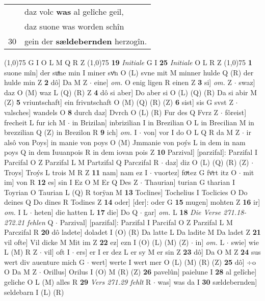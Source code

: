 \documentclass[8pt,a4paper,notitlepage]{article}
\begin{document}
\begin{table}[ht]
\begin{minipage}[t]{0.5\linewidth}
\begin{tabular}{rl}
 & daz volc \textbf{was} al gelîche geil,\\ 
 & daz suone was worden schîn\\ 
30 & gein der \textbf{sældebernden} herzogîn.\\ 
\end{tabular}
\scriptsize
\line(1,0){75} \newline
G I O L M Q R Z \newline
\line(1,0){75} \newline
\textbf{19} \textit{Initiale} G I  \textbf{25} \textit{Initiale} O L R Z  \newline
\line(1,0){75} \newline
\textbf{1} suone mîn] der suͤne min I miner svͦn O (L) svne mit M minner hulde Q (R) der hulde min Z \textbf{2} dô] Da M Z  $\cdot$ eine] \textit{om.} O enig ligen R einen Z \textbf{3} si] \textit{om.} Z  $\cdot$ swaz] daz O (M) waz L (Q) (R) Z \textbf{4} dô si aber] Do aber si O (L) (Q) (R) Da si abir M (Z) \textbf{5} vriuntschaft] ein frivntschaft O (M) (Q) (R) (Z) \textbf{6} sist] sis G svst Z  $\cdot$ valsches] wandels O \textbf{8} durch daz] Dvrch O (L) (R) Fur des Q Fvrz Z  $\cdot$ fôreist] frecheit L fur ich M  $\cdot$ in Brizilan] inbrizilian I in Brezilian O L in Brecilian M in brezzilian Q (Z) in Brezilon R \textbf{9} ich] \textit{om.} I  $\cdot$ von] vor I do O L Q R da M Z  $\cdot$ ir alsô von Poys] in manie von poys O (M) Jmmanie von poýs L in dem in nam poys Q in dem Iuuanpois R in dem iovan pois Z \textbf{10} Parzival] [parzifal]: Parzifal I Parcifal O Z Parzifal L M Partzifal Q Parczifal R  $\cdot$ daz] diz O (L) (Q) (R) (Z)  $\cdot$ Troys] Troýs L trois M R Z \textbf{11} nam] nam ez I  $\cdot$ vuortez] foͮtez G fvͦrt itz O  $\cdot$ mit im] von R \textbf{12} es] sin I Ez O M Er Q Des Z  $\cdot$ Thaurian] turian G tharian I Toyrian O Taurian L (Q) R torÿan M \textbf{13} Toclines] Tochelius I Toclicies O Do deines Q Do dines R Todines Z \textbf{14} oder] [der]: oder G \textbf{15} mugen] mohten Z \textbf{16} ir] \textit{om.} I L  $\cdot$ heten] die hatten L \textbf{17} die] Do Q  $\cdot$ gar] \textit{om.} L \textbf{18} \textit{Die Verse 271.18-272.21 fehlen} Q   $\cdot$ Parzival] [parzifal]: Parzifal I Parcifal O Z Parzifal L M Parczifal R \textbf{20} dô ladete] doladet I (O) (R) Da latte L Da ladite M Da ladet Z \textbf{21} vil ofte] Vil dicke M Mit im Z \textbf{22} ez] ezn I (O) (L) (M) (Z)  $\cdot$ in] \textit{om.} L  $\cdot$ swie] wie L (M) R Z  $\cdot$ vil] oft I  $\cdot$ ers] er I er dez L er sy M er sin Z \textbf{23} dô] Da O M Z \textbf{24} sus wert div auenture mich G  $\cdot$ wert] werte I wert mer O (L) (M) (R) (Z) \textbf{25} dô] ÷o O Da M Z  $\cdot$ Orillus] Orilus I (O) M (R) (Z) \textbf{26} pavelûn] paielune I \textbf{28} al gelîche] geliche O L (M) alles R \textbf{29} \textit{Vers 271.29 fehlt} R   $\cdot$ was] was da I \textbf{30} sældebernden] seldebarn I (L) (R) \newline

\end{minipage}
\end{table}
\end{document}
